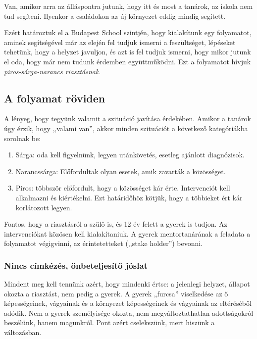 Van, amikor arra az álláspontra jutunk, hogy itt és most a tanárok, az
iskola nem tud segíteni. Ilyenkor a családokon az új környezet eddig
mindig segített.

Ezért határoztuk el a Budapest School szintjén, hogy kialakítunk egy
folyamatot, aminek segítségével már az elején fel tudjuk ismerni a
feszültséget, lépéseket tehetünk, hogy a helyzet javuljon, és azt is fel
tudjuk ismerni, hogy mikor jutunk el oda, hogy már nem tudunk érdemben
együttműködni. Ezt a folyamatot hívjuk \emph{piros-sárga-narancs riasztásnak}.

\hypertarget{folyamat-roviden}{%
\subsection{A folyamat röviden}\label{folyamat-roviden}}

A lényeg, hogy tegyünk valamit a szituáció javítása érdekében. Amikor a
tanárok úgy érzik, hogy ,,valami van'', akkor minden szituációt a
következő kategóriákba sorolnak be:

\begin{enumerate}
\def\labelenumi{\arabic{enumi}.}
\tightlist
\item
  Sárga: oda kell figyelnünk, legyen utánkövetés, esetleg ajánlott
  diagnózisok.
\item
  Narancssárga: Előfordultak olyan esetek, amik zavarták a közösséget.
\item
  Piros: többször előfordult, hogy a közösséget kár érte. Intervenciót
  kell alkalmazni és kiértékelni. Ezt határidőhöz kötjük, hogy a
  többieket ért
  kár korlátozott legyen.
\end{enumerate}

Fontos, hogy a riasztásról a szülő is, és 12 év felett a gyerek is
tudjon. Az intervenciókat közösen kell kialakítaniuk. A gyerek
mentortanárának a feladata a folyamatot végigvinni, az érintetetteket
(,,stake holder'') bevonni.

\hypertarget{nem-lesz-cimkezes-onbeteljesito-joslat}{%
\subsubsection{Nincs címkézés, önbeteljesítő
jóslat}\label{nem-lesz-cimkezes-onbeteljesito-joslat}}

Mindent meg kell tennünk azért, hogy mindenki értse: a jelenlegi
helyzet, állapot okozta a riasztást, nem pedig a gyerek. A gyerek „furcsa''
viselkedése az ő képességeinek, vágyainak és a környezet képességeinek
és vágyainak az eltéréséből adódik. Nem a gyerek személyisége okozta, nem
megváltoztathatlan adottságokról beszélünk, hanem magunkról. Pont azért\break
cselekszünk, mert hiszünk a változásban.

